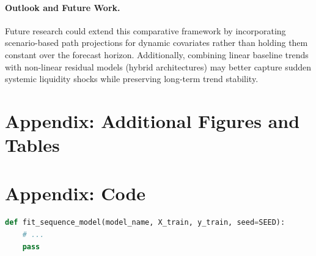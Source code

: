 \documentclass[11pt,a4paper]{article}
\begin{document}
\paragraph{Outlook and Future Work.}
Future research could extend this comparative framework by incorporating scenario-based path projections for dynamic covariates rather than holding them constant over the forecast horizon. Additionally, combining linear baseline trends with non-linear residual models (hybrid architectures) may better capture sudden systemic liquidity shocks while preserving long-term trend stability.




\appendix
\section{Appendix: Additional Figures and Tables}
\label{app:additional}

\section{Appendix: Code}
\label{app:code}
\begin{lstlisting}[language=Python, caption={Example: model fitting excerpt}]
def fit_sequence_model(model_name, X_train, y_train, seed=SEED):
    # ...
    pass
\end{lstlisting}
\end{document}
